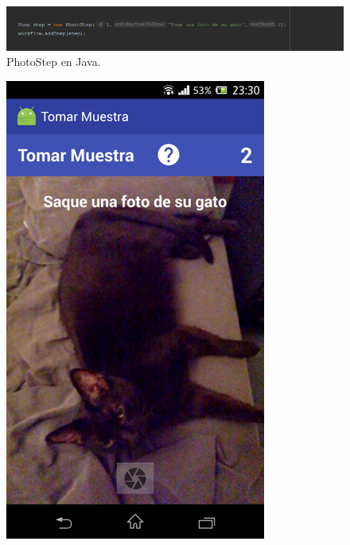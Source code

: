 \begin{figure}[H]
  \centering
    \includegraphics[scale=0.6]{50-anexos/C-steps/photo_java.png} 
    \caption{PhotoStep en Java.}
\end{figure}


\begin{figure}[H]
  \centering
    \includegraphics[scale=0.4]{05-implementacion/PhotoStep1.png} 

\end{figure}
